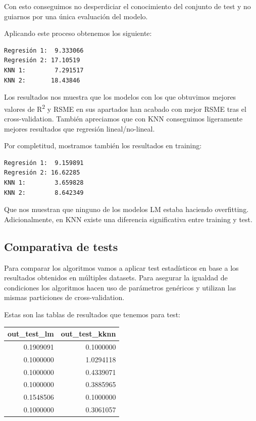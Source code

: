 Con esto conseguimos no desperdiciar el conocimiento del conjunto de test y no guiarnos por una única evaluación del modelo.

\vspace{\baselineskip}

Aplicando este proceso obtenemos los siguiente:
\begin{verbatim}
Regresión 1:  9.333066
Regresión 2: 17.10519
KNN 1:        7.291517
KNN 2:       18.43846
\end{verbatim}

Los resultados nos muestra que los modelos con los que obtuvimos mejores valores de R\textsuperscript{2} y RSME en sus apartados han acabado con mejor RSME tras el cross-validation. También apreciamos que con KNN conseguimos ligeramente mejores resultados que regresión lineal/no-lineal.

\vspace{\baselineskip}

Por completitud, mostramos también los resultados en training:
\begin{verbatim}
Regresión 1:  9.159891
Regresión 2: 16.62285
KNN 1:        3.659828
KNN 2:        8.642349
\end{verbatim}

Que nos muestran que ninguno de los modelos LM estaba haciendo overfitting. 
Adicionalmente, en KNN existe una diferencia significativa entre training y test.

\subsection{Comparativa de tests}

Para comparar los algoritmos vamos a aplicar test estadísticos en base a los resultados obtenidos en múltiples datasets. Para asegurar la igualdad de condiciones los algoritmos hacen uso de parámetros genéricos y utilizan las mismas particiones de cross-validation.

\vspace{\baselineskip}

Estas son las tablas de resultados que tenemos para test:
\begin{longtable}[]{@{}rr@{}}
\toprule
out\_test\_lm & out\_test\_kknn\tabularnewline
\midrule
\endhead
0.1909091 & 0.1000000\tabularnewline
0.1000000 & 1.0294118\tabularnewline
0.1000000 & 0.4339071\tabularnewline
0.1000000 & 0.3885965\tabularnewline
0.1548506 & 0.1000000\tabularnewline
0.1000000 & 0.3061057\tabularnewline
\bottomrule
\end{longtable}

